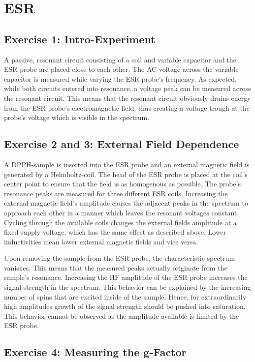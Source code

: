 \chapter{ESR}

\section{Exercise 1: Intro-Experiment}
A passive, resonant circuit consisting of a coil and variable capacitor and the ESR probe are placed close to each other.
The AC voltage across the variable capacitor is measured while varying the ESR probe's frequency.
As expected, while both circuits entered into resonance, a voltage peak can be measured across the resonant circuit.
This means that the resonant circuit obviously drains energy from the ESR probe's electromagnetic field, thus creating a voltage trough at the probe's voltage which is visible in the spectrum.

\section{Exercise 2 and 3: External Field Dependence}
A DPPH-sample is inserted into the ESR probe and an external magnetic field is generated by a Helmholtz-coil.
The head of the ESR probe is placed at the coil's center point to ensure that the field is as homogenous as possible.
The probe's resonance peaks are measured for three different ESR coils.
Increasing the external magnetic field's amplitude causes the adjacent peaks in the spectrum to approach each other in a manner which leaves the resonant voltages constant.
Cycling through the available coils changes the external fields amplitude at a fixed supply voltage, which has the same effect as described above.
Lower inductivities mean lower external magnetic fields and vice versa.

Upon removing the sample from the ESR probe, the characteristic spectrum vanishes.
This means that the measured peaks actually originate from the sample's resonance.
Increasing the HF amplitude of the ESR probe increases the signal strength in the spectrum.
This behavior can be explained by the increasing number of spins that are excited inside of the sample.
Hence, for extraordinarily high amplitudes growth of the signal strength should be pushed into saturation.
This behavior cannot be observed as the amplitude available is limited by the ESR probe.

\section{Exercise 4: Measuring the g-Factor}
